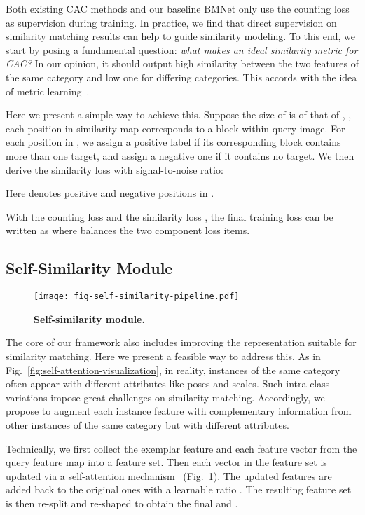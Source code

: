 \documentclass[10pt,twocolumn,letterpaper]{article}
\begin{document}
Both existing CAC methods and our baseline BMNet only use the counting loss as supervision during training. In practice, we find that direct supervision on similarity matching results can help to guide similarity modeling. To this end, we start by posing a fundamental question: \textit{what makes an ideal similarity metric for CAC?} In our opinion, it should output high similarity between the two features of the same category and low one for differing categories. This accords with the idea of metric learning~\cite{metric_learning_reality_check}.

Here we present a simple way to achieve this. Suppose the size of  is  of that of , \ie, each position in similarity map corresponds to a  block within query image. For each position in , we assign a positive label if its corresponding  block contains more than one target, and assign a negative one if it contains no target. We then derive the similarity loss  with signal-to-noise ratio:

Here  denotes positive and negative positions in .

With the counting loss  and the similarity loss , the final training loss can be written as 
where  balances the two component loss items.

\subsection{Self-Similarity Module}
\begin{figure}[t]
    \centering
    \texttt{[image: fig-self-similarity-pipeline.pdf]}
    \vspace{-15pt}
    \caption{\textbf{Self-similarity module.}}
    \label{fig:self-attention-layer}
    \vspace{-5pt}
\end{figure}

The core of our framework also includes improving the representation suitable for similarity matching. Here we present a feasible way to address this. 
As in Fig.~\ref{fig:self-attention-visualization}, in reality, instances of the same category often appear with different attributes like poses and scales. Such intra-class variations impose great challenges on similarity matching. Accordingly, we propose to augment each instance feature with complementary information from other instances of the same category but with different attributes. 

Technically, we first collect the exemplar feature  and each feature vector  from the query feature map into a feature set. Then each vector in the feature set is updated via a self-attention mechanism~\cite{sa_gan} (Fig.~\ref{fig:self-attention-layer}). 
The updated features are added back to the original ones with a learnable ratio . The resulting feature set is then re-split and re-shaped to obtain the final  and .
\end{document}

